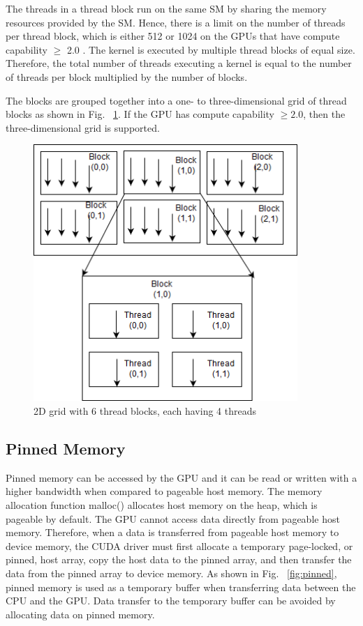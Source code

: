 The threads in a thread block run on the same SM by sharing the memory resources provided by the SM. Hence, there is a limit on the number of threads per thread block, which is either 512 or 1024 on the GPUs that have compute capability \ensuremath{\geq} 2.0 \cite{bib5}. The kernel is executed by multiple thread blocks of equal size. Therefore, the total number of threads executing a kernel is equal to the number of threads per block multiplied by the number of blocks.

The blocks are grouped together into a one- to three-dimensional grid of thread blocks as shown in Fig. ~\ref{fig:cudablock}. If the GPU has compute capability \ensuremath{\geq2.0}, then the three-dimensional grid is supported.

\begin{figure}[H]
	\centering
	\includegraphics[width=10cm]{cudablock.png}
	\caption{2D grid with 6 thread blocks, each having 4 threads}
	\label{fig:cudablock}
\end{figure}
\squeezeup

\subsection{Pinned Memory}
Pinned memory can be accessed by the GPU and it can be read or written with a higher bandwidth when compared to pageable host memory. The memory allocation function malloc() allocates host memory on the heap, which is pageable by default. The GPU cannot access data directly from pageable host memory. Therefore, when a data is transferred from pageable host memory to device memory, the CUDA driver must first allocate a temporary page-locked, or pinned, host array, copy the host data to the pinned array, and then transfer the data from the pinned array to device memory. As shown in Fig. ~\ref{fig:pinned}, pinned memory is used as a temporary buffer when transferring data between the CPU and the GPU. Data transfer to the temporary buffer can be avoided by allocating data on pinned memory.

